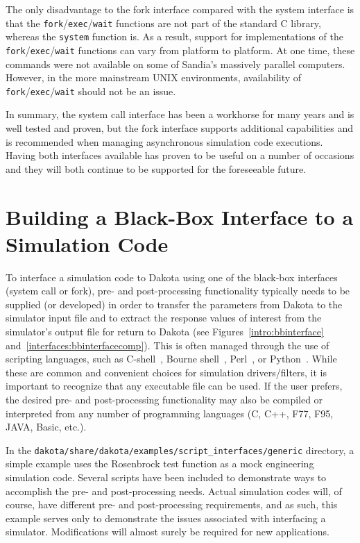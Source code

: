 The only disadvantage to the fork interface compared with
the system interface is that the
\texttt{fork}/\texttt{exec}/\texttt{wait} functions are not part of
the standard C library, whereas the \texttt{system} function is. As a
result, support for implementations of the
\texttt{fork}/\texttt{exec}/\texttt{wait} functions can vary from
platform to platform. At one time, these commands were not available
on some of Sandia's massively parallel computers. However, in the more
mainstream UNIX environments, availability of
\texttt{fork}/\texttt{exec}/\texttt{wait} should not be an issue.

In summary, the system call interface has been a workhorse for many
years and is well tested and proven, but the fork interface
supports additional capabilities and is recommended when managing
asynchronous simulation code executions. Having both interfaces
available has proven to be useful on a number of occasions and they
will both continue to be supported for the foreseeable future.


\section{Building a Black-Box Interface to a Simulation Code}\label{interfaces:building}

To interface a simulation code to Dakota using one of the black-box
interfaces (system call or fork), pre- and post-processing
functionality typically needs to be supplied (or developed) in order
to transfer the parameters from Dakota to the simulator input file and
to extract the response values of interest from the simulator's output
file for return to Dakota (see Figures~\ref{intro:bbinterface}
and~\ref{interfaces:bbinterfacecomp}). This is often managed through
the use of scripting languages, such as C-shell~\cite{And86}, Bourne
shell~\cite{Bli96}, Perl~\cite{Wal96}, or Python~\cite{Mar03}. While
these are common and convenient choices for simulation
drivers/filters, it is important to recognize that any executable file
can be used. If the user prefers, the desired pre- and post-processing
functionality may also be compiled or interpreted from any number of
programming languages (C, C++, F77, F95, JAVA, Basic, etc.).

In the \texttt{dakota/share/dakota/examples/script\_interfaces/generic} directory,
a simple example uses the Rosenbrock test function as a mock
engineering simulation code. Several scripts have been included to
demonstrate ways to accomplish the pre- and post-processing
needs. Actual simulation codes will, of course, have different pre-
and post-processing requirements, and as such, this example serves
only to demonstrate the issues associated with interfacing a
simulator. Modifications will almost surely be required for new
applications.


